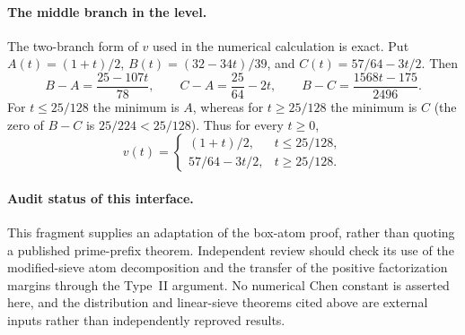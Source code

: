 \paragraph{The middle branch in the level.}
The two-branch form of $v$ used in the numerical calculation is exact.
Put $A(t)=(1+t)/2$, $B(t)=(32-34t)/39$, and
$C(t)=57/64-3t/2$. Then
\[
 B-A=\frac{25-107t}{78},\qquad
 C-A=\frac{25}{64}-2t,\qquad
 B-C=\frac{1568t-175}{2496}.
\]
For $t\le25/128$ the minimum is $A$, whereas for $t\ge25/128$
the minimum is $C$ (the zero of $B-C$ is $25/224<25/128$).
Thus for every $t\ge0$,
\[
 v(t)=\begin{cases}
 (1+t)/2,&t\le25/128,\\
 57/64-3t/2,&t\ge25/128.
 \end{cases}
\]

\paragraph{Audit status of this interface.}
This fragment supplies an adaptation of the box-atom proof, rather
than quoting a published prime-prefix theorem. Independent review
should check its use of the modified-sieve atom decomposition and
the transfer of the positive factorization margins through the
Type~II argument. No numerical Chen constant is asserted here, and
the distribution and linear-sieve theorems cited above are external
inputs rather than independently reproved results.
